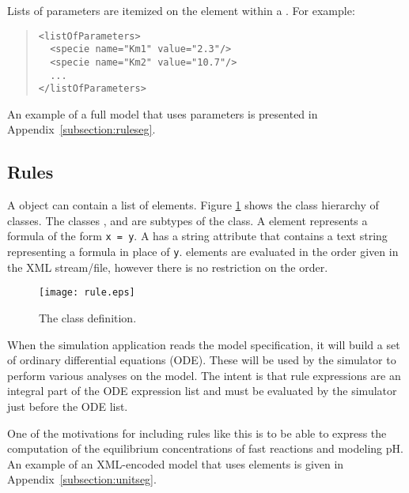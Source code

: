 \documentclass[10pt]{cek-article}
\begin{document}
Lists of parameters are itemized on the  element
within a .  For example:
\begin{quote}
\begin{small}
\tightspacing
\begin{verbatim}
<listOfParameters>
  <specie name="Km1" value="2.3"/>
  <specie name="Km2" value="10.7"/>
  ...
</listOfParameters>
\end{verbatim}
\regularspacing
\end{small}
\end{quote}

An example of a full model that uses parameters is presented in
Appendix~\ref{subsection:ruleseg}.


\subsection{Rules}

A  object can contain a list of  elements.  Figure
\ref{fig:rules} shows the class hierarchy of  classes. The
classes ,  and
 are subtypes of the  class. A
 element represents a formula of the form \verb|x = y|.  A
 has a string attribute  that contains a text
string representing a formula in place of \verb|y|.   elements
are evaluated in the order given in the XML stream/file, however there is no
restriction on the order.

\begin{figure}[htb]
  \centering
  \texttt{[image: rule.eps]}
  \caption{The  class definition.}
  \label{fig:rules}
\end{figure}

When the simulation application reads the model specification, it will
build a set of ordinary differential equations (ODE).  These will be used
by the simulator to perform various analyses on the model.  The intent is
that rule expressions are an integral part of the ODE expression list and
must be evaluated by the simulator just before the ODE list.

One of the motivations for including rules like this is to be able to
express the computation of the equilibrium concentrations of fast reactions
and modeling pH.  An example of an XML-encoded model that uses 
elements is given in Appendix~\ref{subsection:unitseg}.
\end{document}
